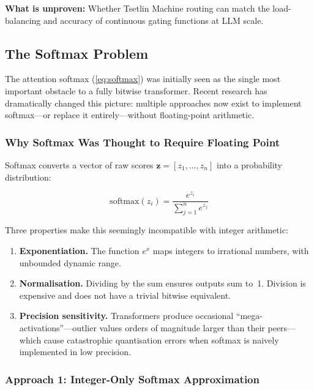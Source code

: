 \textbf{What is unproven:} Whether Tsetlin Machine routing can match
the load-balancing and accuracy of continuous gating functions at LLM
scale.

\subsection{The Softmax Problem}
\label{sec:softmax-problem}

The attention softmax (\cref{eq:softmax}) was initially seen as the
single most important obstacle to a fully bitwise transformer. Recent
research has dramatically changed this picture: multiple approaches
now exist to implement softmax---or replace it entirely---without
floating-point arithmetic.

\subsubsection{Why Softmax Was Thought to Require Floating Point}

Softmax converts a vector of raw scores $\bm{z} = [z_1, \ldots, z_n]$
into a probability distribution:

\[
  \text{softmax}(z_i) = \frac{e^{z_i}}{\sum_{j=1}^{n} e^{z_j}}
\]

Three properties make this seemingly incompatible with integer
arithmetic:

\begin{enumerate}[leftmargin=2em]
  \item \textbf{Exponentiation.} The function $e^x$ maps integers to
    irrational numbers, with unbounded dynamic range.

  \item \textbf{Normalisation.} Dividing by the sum ensures outputs
    sum to~1. Division is expensive and does not have a trivial
    bitwise equivalent.

  \item \textbf{Precision sensitivity.} Transformers produce
    occasional ``mega-activations''---outlier values orders of
    magnitude larger than their peers---which cause catastrophic
    quantisation errors when softmax is naively implemented in low
    precision.
\end{enumerate}

\subsubsection{Approach 1: Integer-Only Softmax Approximation}

